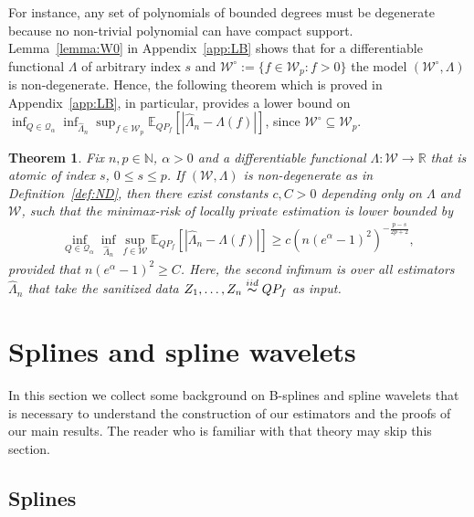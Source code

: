 \documentclass[preprint]{imsart}
\newcommand{\R}{{\mathbb R}}
\newcommand{\E}{{\mathbb E}}
\newcommand{\N}{{\mathbb N}}
\newtheorem{theorem}{Theorem}[section]
\numberwithin{equation}{section}
\newcounter{cond}
\begin{document}
For instance, any set of polynomials of bounded degrees must be degenerate because no non-trivial polynomial can have compact support. Lemma~\ref{lemma:W0} in Appendix~\ref{app:LB} shows that for a differentiable functional $\Lambda$ of arbitrary index $s$ and $\mathcal W^{\circ} := \{f\in\mathcal W_p : f>0\}$ the model $(\mathcal W^\circ,\Lambda)$ is non-degenerate. Hence, the following theorem which is proved in Appendix~\ref{app:LB}, in particular, provides a lower bound on $\inf_{Q\in\mathcal Q_\alpha} \inf_{\hat{\Lambda}_n} \sup_{f\in\mathcal W_p} \E_{QP_f}[|\hat{\Lambda}_n - \Lambda(f)|]$, since $\mathcal W^\circ\subseteq\mathcal W_p$.


\begin{theorem} \label{thm:LBatomic}
Fix $n,p\in\N$, $\alpha>0$ and a differentiable functional $\Lambda:\mathcal W\to\R$ that is atomic of index $s$, $0\le s\le p$. If $(\mathcal W, \Lambda)$ is non-degenerate as in Definition~\ref{def:ND}, then there exist constants $c,C>0$ depending only on $\Lambda$ and $\mathcal W$, such that the minimax-risk of locally private estimation is lower bounded by
\begin{align*}
\inf_{Q\in\mathcal Q_\alpha} \inf_{\hat{\Lambda}_n} \sup_{f\in\mathcal W} \E_{QP_f}\left[|\hat{\Lambda}_n - \Lambda(f)|\right] \ge c \left(n(e^\alpha-1)^2\right)^{-\frac{p-s}{2p+2}},
\end{align*}
provided that $n(e^\alpha-1)^2\ge C$. Here, the second infimum is over all estimators $\hat{\Lambda}_n$ that take the sanitized data $Z_1,\dots, Z_n \stackrel{iid}{\thicksim} QP_f$ as input.
\end{theorem}



\section{Splines and spline wavelets}
\label{sec:Background}

In this section we collect some background on B-splines and spline wavelets that is necessary to understand the construction of our estimators and the proofs of our main results. The reader who is familiar with that theory may skip this section.

\subsection{Splines}
\label{sec:splines}
\end{document}
